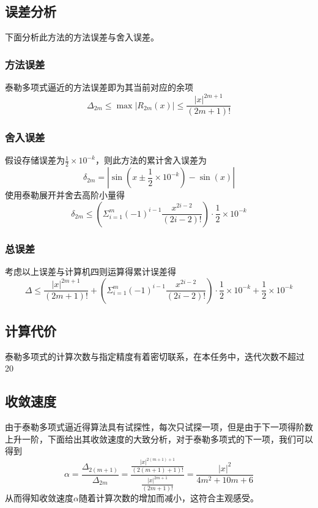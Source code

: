 \documentclass[lang=cn,11pt,a4paper]{elegantpaper}
\begin{document}
\subsection{误差分析}
下面分析此方法的方法误差与舍入误差。
\subsubsection{方法误差}
泰勒多项式逼近的方法误差即为其当前对应的余项
\begin{equation}
  \Delta_{2m} \leq \max|R_{2m}(x)| \leq \frac{|x|^{2m+1}}{(2m+1)!}
\end{equation}
\subsubsection{舍入误差}
假设存储误差为$\frac{1}{2}\times 10^{-k}$，则此方法的累计舍入误差为
\begin{equation}
  \delta_{2m} = |\sin(x\pm \frac{1}{2}\times 10^{-k}) - \sin(x)|
\end{equation}
使用泰勒展开并舍去高阶小量得
\begin{equation}
  \delta_{2m} \leq \left(\Sigma_{i=1}^{m} (-1)^{i-1}\frac{x^{2 i-2}}{(2 i-2) !}\right) \cdot \frac{1}{2}\times 10^{-k}
\end{equation}
\subsubsection{总误差}
考虑以上误差与计算机四则运算得累计误差得
\begin{equation}
  \Delta \leq \frac{|x|^{2m+1}}{(2m+1)!} + \left(\Sigma_{i=1}^{m} (-1)^{i-1}\frac{x^{2 i-2}}{(2 i-2) !} \right)\cdot \frac{1}{2}\times 10^{-k} + \frac{1}{2}\times 10^{-k}
\end{equation}
\subsection{计算代价}
泰勒多项式的计算次数与指定精度有着密切联系，在本任务中，迭代次数不超过 20
\subsection{收敛速度}
由于泰勒多项式逼近得算法具有试探性，每次只试探一项，但是由于下一项得阶数上升一阶，下面给出其收敛速度的大致分析，对于泰勒多项式的下一项，我们可以得到
\begin{equation}
  \alpha = \frac{\Delta_{2(m+1)}}{\Delta_{2m}} = \frac{\frac{|x|^{2(m+1)+1}}{(2(m+1)+1)!}}{\frac{|x|^{2m+1}}{(2m+1)!}} = \frac{|x|^2}{4m^2+10m+6}
\end{equation}
从而得知收敛速度$\alpha$随着计算次数的增加而减小，这符合主观感受。
\end{document}
